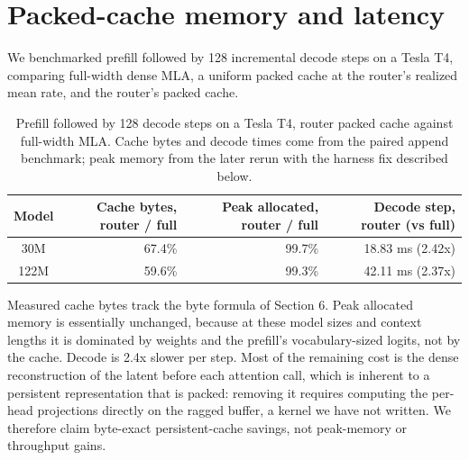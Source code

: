 \documentclass[10pt]{article}
\begin{document}
\section{Packed-cache memory and latency}

We benchmarked prefill followed by 128 incremental decode steps on a Tesla T4, comparing full-width dense MLA, a uniform packed cache at the router's realized mean rate, and the router's packed cache.

\begin{table}[t]
\centering
\caption{Prefill followed by 128 decode steps on a Tesla T4, router packed cache against full-width MLA. Cache bytes and decode times come from the paired append benchmark; peak memory from the later rerun with the harness fix described below.}
\small
\begin{tabular}{crrr}
\toprule
Model & Cache bytes, router / full & Peak allocated, router / full & Decode step, router (vs full) \\
\midrule
30M & 67.4\% & 99.7\% & 18.83 ms (2.42x) \\
122M & 59.6\% & 99.3\% & 42.11 ms (2.37x) \\
\bottomrule
\end{tabular}
\end{table}

Measured cache bytes track the byte formula of Section 6. Peak allocated memory is essentially unchanged, because at these model sizes and context lengths it is dominated by weights and the prefill's vocabulary-sized logits, not by the cache. Decode is 2.4x slower per step. Most of the remaining cost is the dense reconstruction of the latent before each attention call, which is inherent to a persistent representation that is packed: removing it requires computing the per-head projections directly on the ragged buffer, a kernel we have not written. We therefore claim byte-exact persistent-cache savings, not peak-memory or throughput gains.
\end{document}
